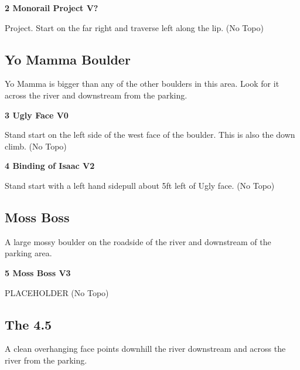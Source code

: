 \begin{multicols}{2}
					\label{rt:Monorail Project}
\colorbox{black!20}{
\parbox{0.95\linewidth}{
\textbf{
2 Monorail Project V?  
}
}
}

					\begin{adjustwidth}{0.5cm}{}				
					Project. Start on the far right and traverse left along the lip.
						\newline (No Topo) 
					\end{adjustwidth}
			\subsection*{Yo Mamma Boulder}\label{bf:Yo Mamma Boulder}
			Yo Mamma is bigger than any of the other boulders in this area. Look for it across the river and downstream from the parking.\\
			
					\label{rt:Ugly Face}
\colorbox{green!20}{
\parbox{0.95\linewidth}{
\textbf{
3 Ugly Face V0   \warn 
}
}
}

					\begin{adjustwidth}{0.5cm}{}				
					Stand start on the left side of the west face of the boulder. This is also the down climb.
						\newline (No Topo) 
					\end{adjustwidth}
					\label{rt:Binding of Isaac}
\colorbox{green!20}{
\parbox{0.95\linewidth}{
\textbf{
4 Binding of Isaac V2    \warn 
}
}
}

					\begin{adjustwidth}{0.5cm}{}				
					Stand start with a left hand sidepull about 5ft left of Ugly face.
						\newline (No Topo) 
					\end{adjustwidth}
			\subsection*{Moss Boss}\label{bf:Moss Boss}
			A large mossy boulder on the roadside of the river and downstream of the parking area.\\
			
					\label{rt:Moss Boss}
\colorbox{green!20}{
\parbox{0.95\linewidth}{
\textbf{
5 Moss Boss V3   
}
}
}

					\begin{adjustwidth}{0.5cm}{}				
					PLACEHOLDER
						\newline (No Topo) 
					\end{adjustwidth}
			\subsection*{The 4.5}\label{bf:The 4.5}
			A clean overhanging face points downhill the river downstream and across the river from the parking.\\
			

\end{multicols}
